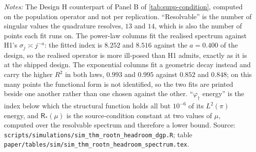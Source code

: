 \documentclass[
  12pt]{article}
\newcommand{\1}[1]{\mathds{1}\left[#1\right]}
\theoremstyle{plain}
\theoremstyle{definition}
\theoremstyle{definition}
\theoremstyle{remark}
\newcommand{\vdagger}{\varphi_{\dagger}}
\begin{document}
\begin{table}[!htbp]
\centering
\begin{threeparttable}
\caption{The operator the two headroom laws realise}
\label{tab:supp-h-spectrum}
\tiny

\begin{tablenotes}\footnotesize
\item \textit{Notes:} The Design H counterpart of Panel B of
\cref{tab:supp-condition}, computed on the population operator and not per
replication. ``Resolvable'' is the number of singular values the quadrature
resolves, $13$ and $14$, which is also the number of points each fit runs on.
The power-law columns fit the realised spectrum against H1's
$\sigma_j\asymp j^{-a}$: the fitted index is $8.252$ and $8.516$ against the
$a=0.400$ of the design, so the realised operator is more ill-posed than H1
admits, exactly as it is at the shipped design. The exponential columns fit a
geometric decay instead and carry the higher $R^{2}$ in both laws, $0.993$ and
$0.995$ against $0.852$ and $0.848$; on this many points the functional form is
not identified, so the two fits are printed beside one another rather than one
chosen against the other. ``$\vdagger$ energy'' is the index below which the
structural function holds all but $10^{-6}$ of its $L^{2}(\pi)$ energy, and
$\mathsf R_\ast(\mu)$ is the source-condition constant at two values of $\mu$,
computed over the resolvable spectrum and therefore a lower bound. Source:
\texttt{scripts/simulations/sim\_thm\_rootn\_headroom\_dgp.R}; table
\texttt{paper/tables/sim/sim\_thm\_rootn\_headroom\_spectrum.tex}.
\end{tablenotes}
\end{threeparttable}
\end{table}
\end{document}
